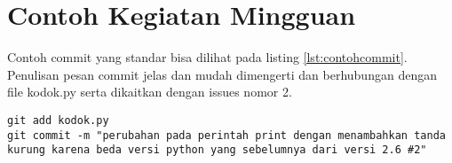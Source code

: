 \section{Contoh Kegiatan Mingguan}
Contoh commit yang standar bisa dilihat pada listing \ref{lst:contohcommit}. Penulisan pesan commit jelas dan mudah dimengerti dan berhubungan dengan file kodok.py serta dikaitkan dengan issues nomor 2.
\begin{lstlisting}[caption=Contoh commit standar,label={lst:contohcommit}]
git add kodok.py
git commit -m "perubahan pada perintah print dengan menambahkan tanda kurung karena beda versi python yang sebelumnya dari versi 2.6 #2"
\end{lstlisting}
